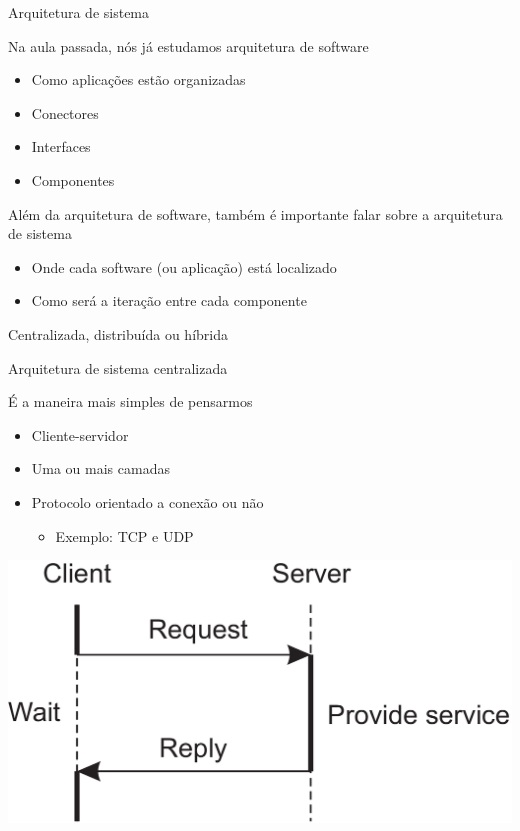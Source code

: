 \documentclass[compress]{beamer}
\begin{document}
\begin{frame}{Arquitetura de sistema}

Na aula passada, nós já estudamos arquitetura de software
\begin{itemize}
    \item Como aplicações estão organizadas
    \item Conectores
    \item Interfaces
    \item Componentes
\end{itemize}

Além da arquitetura de software, também é importante falar sobre a arquitetura de sistema
\begin{itemize}
    \item Onde cada software (ou aplicação) está localizado
    \item Como será a iteração entre cada componente
\end{itemize}

Centralizada, distribuída ou híbrida

\end{frame}


\begin{frame}{Arquitetura de sistema centralizada}

 
É a maneira mais simples de pensarmos
\begin{itemize}
    \item Cliente-servidor
    \item Uma ou mais camadas
    \item Protocolo orientado a conexão ou não
    \begin{itemize}
        \item Exemplo: TCP e UDP
    \end{itemize}
\end{itemize}
    
\vspace{1cm}

\centering\includegraphics[width=0.65\linewidth]{images/client-server.png}

\end{frame}
\end{document}

